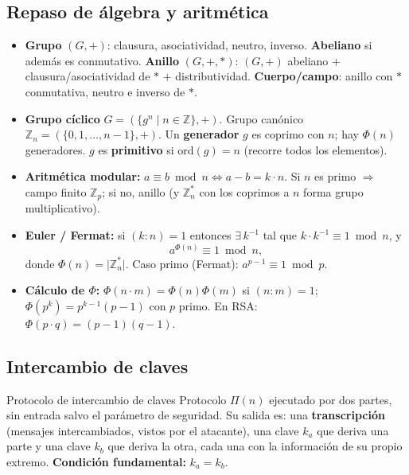 \documentclass[../main.tex]{subfiles}
\begin{document}
\subsection{Repaso de álgebra y aritmética}

\begin{itemize}[leftmargin=1.4em]
  \item \textbf{Grupo} $(G,+)$: clausura, asociatividad, neutro, inverso.
  \textbf{Abeliano} si además es conmutativo. \textbf{Anillo} $(G,+,*)$: $(G,+)$
  abeliano $+$ clausura/asociatividad de $*$ $+$ distributividad. \textbf{Cuerpo/campo}:
  anillo con $*$ conmutativa, neutro e inverso de $*$.
  \item \textbf{Grupo cíclico} $G=(\{g^n\mid n\in\mathbb{Z}\},+)$. Grupo canónico
  $\mathbb{Z}_n=(\{0,1,\dots,n-1\},+)$. Un \textbf{generador} $g$ es coprimo con
  $n$; hay $\Phi(n)$ generadores. $g$ es \textbf{primitivo} si $\mathrm{ord}(g)=n$
  (recorre todos los elementos).
  \item \textbf{Aritmética modular:} $a \equiv b \bmod n \Leftrightarrow a-b=k\cdot n$.
  Si $n$ es primo $\Rightarrow$ campo finito $\mathbb{Z}_p$; si no, anillo (y
  $\mathbb{Z}_n^*$ con los coprimos a $n$ forma grupo multiplicativo).
  \item \textbf{Euler / Fermat:} si $(k:n)=1$ entonces $\exists\, k^{-1}$ tal que
  $k\cdot k^{-1}\equiv 1 \bmod n$, y
  \[ a^{\Phi(n)} \equiv 1 \bmod n, \]
  donde $\Phi(n)=\lvert\mathbb{Z}_n^*\rvert$. Caso primo (Fermat):
  $a^{p-1}\equiv 1 \bmod p$.
  \item \textbf{Cálculo de $\Phi$:} $\Phi(n\cdot m)=\Phi(n)\Phi(m)$ si $(n:m)=1$;
  $\Phi(p^k)=p^{k-1}(p-1)$ con $p$ primo. En RSA: $\Phi(p\cdot q)=(p-1)(q-1)$.
\end{itemize}

\subsection{Intercambio de claves}

\begin{definicion}{Protocolo de intercambio de claves}
Protocolo $\Pi(n)$ ejecutado por dos partes, sin entrada salvo el parámetro de
seguridad. Su salida es: una \textbf{transcripción} (mensajes intercambiados, vistos
por el atacante), una clave $k_a$ que deriva una parte y una clave $k_b$ que deriva
la otra, cada una con la información de su propio extremo. \textbf{Condición
fundamental:} $k_a=k_b$.
\end{definicion}
\end{document}
